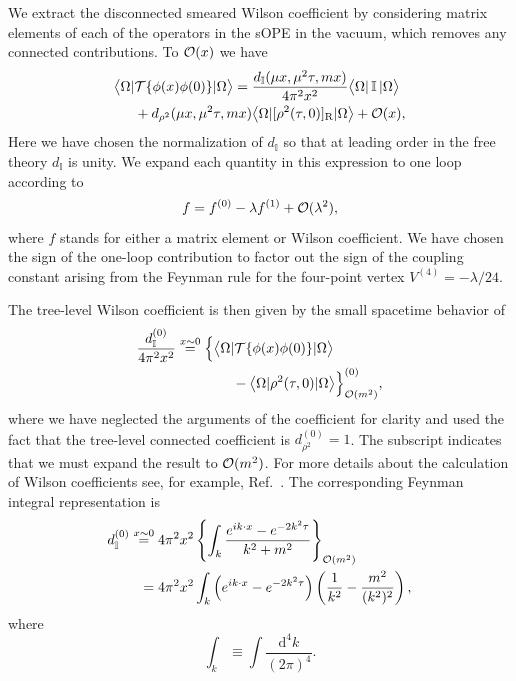 We extract the disconnected smeared Wilson coefficient by considering matrix 
elements of each of the operators in the sOPE in the vacuum, which removes any 
connected contributions.  To ${\cal O}(x)$ we have
\begin{align}
\big\langle \Omega  |  {} &{\cal T}\{ 
\phi(x) \phi(0)\}  | \Omega \big\rangle =  
\frac{d_{\mathbb{I}}(\mu x,\mu^2\tau,mx)}{4\pi^2x^2}\big\langle \Omega | \,
\mathbb{I} \,| \Omega \big\rangle
\nonumber\\
{} & + 
d_{\rho^2}(\mu x,\mu^2\tau,mx)\big\langle \Omega | [\rho^2(\tau,0) 
]_{\mathrm{R}}| \Omega 
\big\rangle  + 
{\cal O}(x),
\end{align}
Here we have chosen the normalization of $d_{\mathbb{I}}$ so that at leading 
order in the free theory $d_{\mathbb{I}}$ is unity. We expand each quantity in 
this expression to one loop according to
\begin{equation}\label{eq:drhoexp}
f = f^{(0)} - \lambda f^{(1)} + {\cal O}(\lambda^2),
\end{equation}
where $f$ stands for either a matrix element or Wilson coefficient. We have 
chosen the sign of the one-loop contribution to factor out the sign of the 
coupling constant arising from the Feynman rule for the four-point vertex 
$V^{(4)} = -\lambda/24$. 

The tree-level Wilson coefficient is then given by the small spacetime 
behavior of
\begin{align}
\frac{d_{\mathbb{I}}^{(0)}}{4\pi^2x^2}  \stackrel{x\sim 0}{=}{} & 
 \Big\{\big\langle 
\Omega | 
{\cal T}\{ 
\phi(x){} \phi(0)\} | \Omega \big\rangle \nonumber\\
{} & \qquad - \big\langle \Omega | 
\rho^2(\tau,0)  | \Omega 
\big\rangle\Big\}_{{\cal O}(m^2)}^{(0)} ,
\end{align}
where we have neglected the arguments of the coefficient for clarity and used 
the fact that the tree-level connected
coefficient is $d_{\rho^2}^{(0)}=1$. The subscript indicates 
that we must expand the result to ${\cal O}(m^2)$. For more details about the 
calculation of Wilson coefficients see, for example, 
Ref.~\cite{Collins:1984rdg}. 
The corresponding Feynman integral representation is
\begin{align}
d_{\mathbb{I}}^{(0)} \stackrel{x\sim 0}{=} {} & 4\pi^2 x^2\left\{\int_k 
\frac{e^{ik 
\cdot 
x}-e^{-2k^2 \tau 
}}{k^2+m^2}\right\}_{{\cal O}(m^2)}
\nonumber \\
= {} & 4\pi^2x^2\int_k \left(e^{ik \cdot x} - e^{-2k^2 
\tau}\right)\left(\frac{1}{k^2} - \frac{m^2}{(k^2)^2}\right),
\end{align}
where
\begin{equation}
\int_k \equiv \int\frac{\mathrm{d}^4k}{(2\pi)^4}.
\end{equation}

